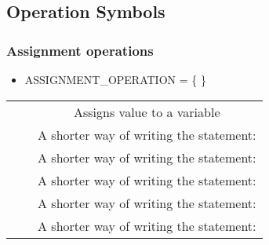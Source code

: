 \subsection{Operation Symbols}

\subsubsection{Assignment operations}
\begin{itemize}
  \item ASSIGNMENT\_OPERATION = \{ \cd{ =, +=, -=, *=, /=, \%= } \}
\end{itemize}
\begin{center}
\begin{tabulary}{\linewidth}{|C|C|C|}
  \hline
   &  &  \\
  \hline
  \hline
  \cd{=} &  & Assigns value to a variable \\
  \hline
  \cd{+=} &  & A shorter way of writing the statement:  \\
  \hline
  \cd{-=} &  & A shorter way of writing the statement:  \\
  \hline
  \cd{*=} &  & A shorter way of writing the statement:  \\
  \hline
  \cd{/=} &  & A shorter way of writing the statement:  \\
  \hline
  \cd{\%=} &  & A shorter way of writing the statement:  \\
  \hline
\end{tabulary}
\end{center}

